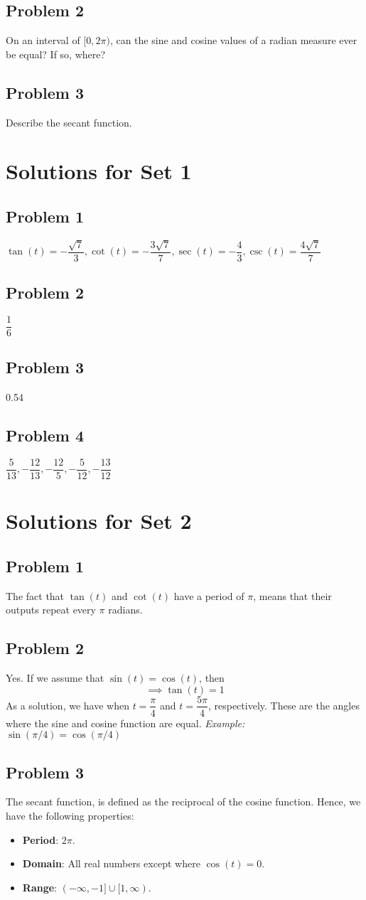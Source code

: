 \documentclass[12pt]{article}
\begin{document}
\subsection*{Problem 2}
On an interval of \([0,2\pi)\), can the sine and cosine values of a radian measure ever be equal? If so, where?

\subsection*{Problem 3}
Describe the secant function.

\newpage
\section*{Solutions for Set 1}
\subsection*{Problem 1}
\(\tan(t)=-\dfrac{\sqrt{7}}{3},\cot(t)=-\dfrac{3\sqrt{7}}{7},\sec(t)=-\dfrac{4}{3},\csc(t)=\dfrac{4\sqrt{7}}{7}\)
\subsection*{Problem 2}
\(\dfrac{1}{6}\)
\subsection*{Problem 3}
0.54
\subsection*{Problem 4}
\(\dfrac{5}{13},-\dfrac{12}{13},-\dfrac{12}{5},-\dfrac{5}{12},-\dfrac{13}{12}\)
\section*{Solutions for Set 2}
\subsection*{Problem 1}
The fact that \(\tan(t)\) and \(\cot(t)\) have a period of \(\pi\), means that their outputs repeat every \(\pi\) radians.
\subsection*{Problem 2}
Yes. If we assume that \(\sin(t)=\cos(t)\), then
\[\implies \tan(t)=1\]
As a solution, we have when \(t=\dfrac{\pi}{4}\) and \(t=\dfrac{5\pi}{4}\), respectively. These are the angles where the sine and cosine function are equal. \textit{Example: \(\sin(\pi/4)=\cos(\pi/4)\)}
\subsection*{Problem 3}
The secant function, is defined as the reciprocal of the cosine function. Hence, we have the following properties:
\begin{itemize}
    \item \textbf{Period}: \(2\pi\).
    \item \textbf{Domain}: All real numbers except where \(\cos(t)=0\).
    \item \textbf{Range}: \((-\infty,-1] \cup [1,\infty)\).
\end{itemize}
\end{document}
